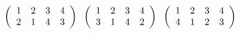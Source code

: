 \documentclass[]{article}
\begin{document}
    \begin{math}
\\
        \left(
        \begin{array}{cccc}
        1&2&3&4\\
        2&1&4&3\\
        \end{array}
        \right)
        \;\;
        \left(
        \begin{array}{cccc}
        1&2&3&4\\
        3&1&4&2\\
        \end{array}
        \right)
        \;\;
        \left(
        \begin{array}{cccc}
        1&2&3&4\\
        4&1&2&3\\
        \end{array}
        \right)
        \;\;    \end{math}


    
\end{document}
